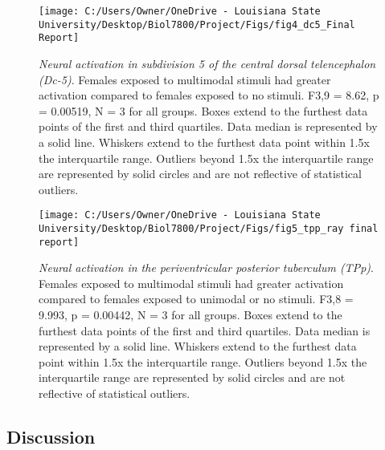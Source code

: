 \documentclass[
  12pt,
]{article}
\begin{document}
\begin{figure}[H]

{\centering \texttt{[image: C:/Users/Owner/OneDrive - Louisiana State University/Desktop/Biol7800/Project/Figs/fig4\_dc5\_Final Report]} 

}

\caption{\emph{Neural activation in subdivision 5 of the central dorsal telencephalon (Dc-5)}. Females exposed to multimodal stimuli had greater activation compared to females exposed to no stimuli. F3,9 = 8.62, p = 0.00519, N = 3 for all groups. Boxes extend to the furthest data points of the first and third quartiles. Data median is represented by a solid line. Whiskers extend to the furthest data point within 1.5x the interquartile range. Outliers beyond 1.5x the interquartile range are represented by solid circles and are not reflective of statistical outliers.}\label{fig:fig4}
\end{figure}



\begin{figure}[H]

{\centering \texttt{[image: C:/Users/Owner/OneDrive - Louisiana State University/Desktop/Biol7800/Project/Figs/fig5\_tpp\_ray final report]} 

}

\caption{\emph{Neural activation in the periventricular posterior tuberculum (TPp)}. Females exposed to multimodal stimuli had greater activation compared to females exposed to unimodal or no stimuli. F3,8 = 9.993, p = 0.00442, N = 3 for all groups. Boxes extend to the furthest data points of the first and third quartiles. Data median is represented by a solid line. Whiskers extend to the furthest data point within 1.5x the interquartile range. Outliers beyond 1.5x the interquartile range are represented by solid circles and are not reflective of statistical outliers.}\label{fig:fig5}
\end{figure}

\hypertarget{discussion}{%
\subsection{Discussion}\label{discussion}}
\end{document}
